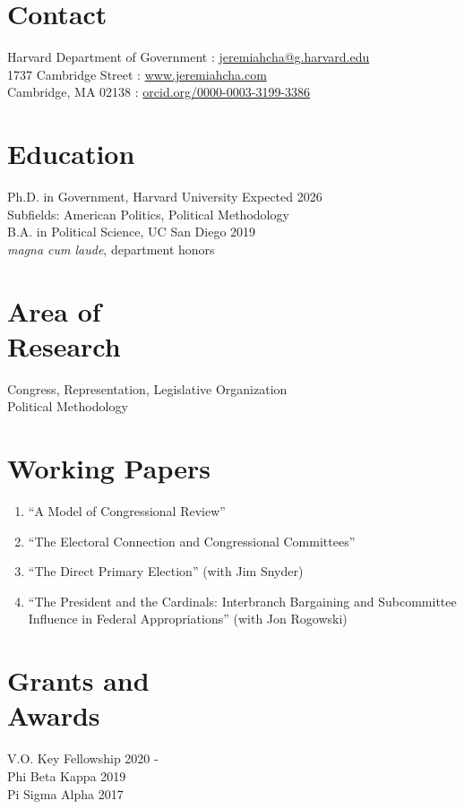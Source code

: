 \documentclass[margin, line]{res}
\begin{document}
\begin{resume}

\section{Contact}
Harvard Department of Government \hfill \Letter: \href{mailto:jeremiahcha@g.harvard.edu}{jeremiahcha@g.harvard.edu}\\
1737 Cambridge Street \hfill \Mundus: \href{httsp://www.jeremiahcha.com}{www.jeremiahcha.com}\\
Cambridge, MA 02138 \hfill \Mundus: \href{https://orcid.org/0000-0003-3199-3386}{orcid.org/0000-0003-3199-3386}

\section{Education}
Ph.D. in Government, Harvard University \hfill Expected 2026\\
\hspace*{5mm}Subfields: American Politics, Political Methodology \\
B.A. in Political Science, UC San Diego \hfill 2019\\
\hspace*{5mm}\textit{magna cum laude}, department honors

\section{Area of \\Research}
Congress, Representation, Legislative Organization\\
Political Methodology

\section{Working Papers}
\begin{enumerate}
	\item ``A Model of Congressional Review''
	\item ``The Electoral Connection and Congressional Committees''
	\item ``The Direct Primary Election'' (with Jim Snyder)
	\item ``The President and the Cardinals: Interbranch Bargaining and Subcommittee Influence in Federal Appropriations'' (with Jon Rogowski)
\end{enumerate}

\section{Grants and \\Awards}
V.O. Key Fellowship \hfill 2020 - \\
Phi Beta Kappa \hfill 2019\\
Pi Sigma Alpha \hfill 2017


\end{resume}
\end{document}

